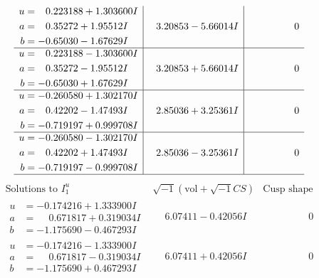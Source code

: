 \documentclass[1p]{elsarticle_modified}
\theoremstyle{definition}
\newcommand{\I}{\sqrt{-1}}
\begin{document}
$$\begin{array}{c|c|c}
\begin{aligned}
u &= \phantom{-}0.223188 + 1.303600 I \\
a &= \phantom{-}0.35272 + 1.95512 I \\
b &= -0.65030 - 1.67629 I\end{aligned}
 & \phantom{-}3.20853 - 5.66014 I & \phantom{-0.000000 } 0 \\ \hline\begin{aligned}
u &= \phantom{-}0.223188 - 1.303600 I \\
a &= \phantom{-}0.35272 - 1.95512 I \\
b &= -0.65030 + 1.67629 I\end{aligned}
 & \phantom{-}3.20853 + 5.66014 I & \phantom{-0.000000 } 0 \\ \hline\begin{aligned}
u &= -0.260580 + 1.302170 I \\
a &= \phantom{-}0.42202 - 1.47493 I \\
b &= -0.719197 + 0.999708 I\end{aligned}
 & \phantom{-}2.85036 + 3.25361 I & \phantom{-0.000000 } 0 \\ \hline\begin{aligned}
u &= -0.260580 - 1.302170 I \\
a &= \phantom{-}0.42202 + 1.47493 I \\
b &= -0.719197 - 0.999708 I\end{aligned}
 & \phantom{-}2.85036 - 3.25361 I & \phantom{-0.000000 } 0\\
 \hline 
 \end{array}$$\newpage$$\begin{array}{c|c|c}  
\text{Solutions to }I^u_{1}& \I (\text{vol} + \sqrt{-1}CS) & \text{Cusp shape}\\
 \hline 
\begin{aligned}
u &= -0.174216 + 1.333900 I \\
a &= \phantom{-}0.671817 + 0.319034 I \\
b &= -1.175690 - 0.467293 I\end{aligned}
 & \phantom{-}6.07411 - 0.42056 I & \phantom{-0.000000 } 0 \\ \hline\begin{aligned}
u &= -0.174216 - 1.333900 I \\
a &= \phantom{-}0.671817 - 0.319034 I \\
b &= -1.175690 + 0.467293 I\end{aligned}
 & \phantom{-}6.07411 + 0.42056 I & \phantom{-0.000000 } 0 \\ \hline\begin{aligned}

\end{aligned}
\end{array}$$
\end{document}

